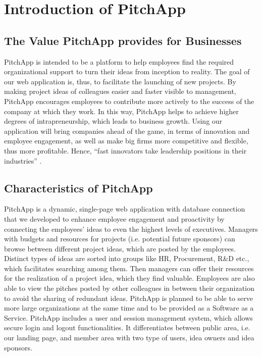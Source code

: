 \chapter{Introduction of PitchApp}

\section{The Value PitchApp provides for Businesses}

PitchApp is intended to be a platform to help employees find the required organizational support to turn their ideas from inception to reality. The goal of our web application is, thus, to facilitate the launching of new projects. By making project ideas of colleagues easier and faster visible to management, PitchApp encourages employees to contribute more actively to the success of the company at which they work. In this way, PitchApp helps to achieve higher degrees of intrapreneurship, which leads to business growth. Using our application will bring companies ahead of the game, in terms of innovation and
employee engagement, as well as make big firms more competitive and flexible, thus more
profitable. Hence, “fast innovators take leadership positions in their industries” \parencite{SH90}.

\section{Characteristics of PitchApp}

PitchApp is a dynamic, single-page web application with database connection that we developed to enhance employee engagement and proactivity by connecting the employees’ ideas to even the highest levels of executives. Managers with budgets and resources for projects (i.e. potential future sponsors) can browse between different project ideas, which are posted by the employees. Distinct types of ideas are sorted into groups like HR, Procurement, R\&D etc., which facilitates searching among them. Then managers can offer their resources for the realization of a project idea, which they find valuable. Employees are also able to view the pitches posted by other colleagues in between their organization to avoid the sharing of redundant ideas. PitchApp is planned to be able to serve more large organizations at the same time and to be provided as a Software as a Service. PitchApp includes a user and session management system, which allows secure login and logout functionalities. It differentiates between public area, i.e. our landing page, and member area with two type of users, idea owners and idea sponsors.


